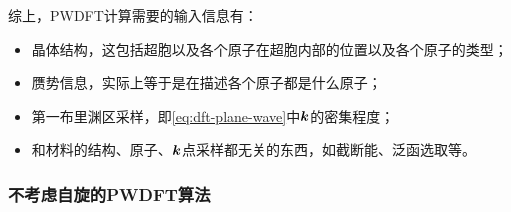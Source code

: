 综上，PWDFT计算需要的输入信息有：
\begin{itemize}
    \item 晶体结构，这包括超胞以及各个原子在超胞内部的位置以及各个原子的类型；
    \item 赝势信息，实际上等于是在描述各个原子都是什么原子；
    \item 第一布里渊区采样，即\eqref{eq:dft-plane-wave}中$\vb*{k}$的密集程度；
    \item 和材料的结构、原子、$\vb*{k}$点采样都无关的东西，如截断能、泛函选取等。
\end{itemize}

\subsubsection{不考虑自旋的PWDFT算法}

